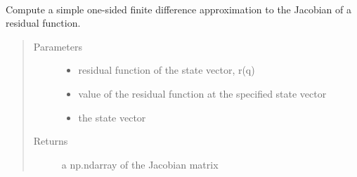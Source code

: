 \documentclass[letterpaper,10pt,english]{sphinxmanual}
\begin{document}
\begin{fulllineitems}

\begin{fulllineitems}
\label{\detokenize{spitfire.time.nonlinear:spitfire.time.nonlinear.SolverOutput.solution}}~
\end{fulllineitems}


\end{fulllineitems}


\begin{fulllineitems}
\label{\detokenize{spitfire.time.nonlinear:spitfire.time.nonlinear.finite_difference_jacobian}}
Compute a simple one-sided finite difference approximation to the Jacobian of a residual function.
\begin{quote}\begin{description}
\item[{Parameters}] \leavevmode\begin{itemize}
\item {} 
 \textendash{} residual function of the state vector, r(q)

\item {} 
 \textendash{} value of the residual function at the specified state vector

\item {} 
 \textendash{} the state vector

\end{itemize}

\item[{Returns}] \leavevmode
a np.ndarray of the Jacobian matrix

\end{description}\end{quote}

\end{fulllineitems}
\end{document}
